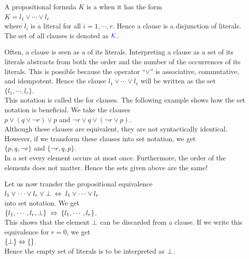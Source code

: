 \begin{Definition}[Clause]
  A propositional formula $K$ is a  when it has the form \\[0.2cm]
  \hspace*{1.3cm} $K = l_1 \vee \cdots \vee l_r$ \\[0.2cm]
  where $l_i$ is a literal for all $i=1,\cdots,r$.  Hence a clause is a disjunction of literals.
  The set of all clauses is denoted as  ${\color{blue}\mathcal{K}}$.
  \eox
\end{Definition}

Often, a clause is seen as a  of its literals.  Interpreting a clause as a set of its literals
abstracts from both the order and the number of the occurrences of its literals.
This is possible because the operator ``$\vee$'' is associative, commutative, and idempotent.  
Hence the clause  $l_1 \vee \cdots \vee l_r$ will be written as the set
\\[0.2cm]
\hspace*{1.3cm} $\{ l_1, \cdots, l_r \}$.
\\[0.2cm]
This notation is called the  for clauses.  
The following example shows how the set notation is beneficial.  We take the clauses
\\[0.2cm]
\hspace*{1.3cm}
$p \vee (q \vee \neg r) \vee p$ \quad and \quad $\neg r \vee q \vee (\neg r \vee p)$. 
\\[0.2cm]
Although these clauses are equivalent, they are not syntactically identical.  However, if we transform these
clauses into set notation, we get
\\[0.2cm]
\hspace*{1.3cm}
$\{p, q, \neg r \}$ \quad and \quad $\{ \neg r, q, p \}$. 
\\[0.2cm]
In a set every element occurs at most once.  Furthermore, the order of the elements does not matter.
Hence the sets given above are the same!

Let us now transfer the propositional equivalence
\\[0.2cm]
\hspace*{1.3cm}
$l_1 \vee \cdots \vee l_r \vee \bot \;\Leftrightarrow\; l_1 \vee \cdots \vee l_r$
\\[0.2cm]
into set notation.  We get
\\[0.2cm]
\hspace*{1.3cm}
$\{ l_1, \cdots, l_r, \bot \} \;\Leftrightarrow\; \{ l_1, \cdots, l_r \}$.
\\[0.2cm]
This shows that the element $\bot$ can be discarded from a clause.  If we write this equivalence for $r=0$,
we get
\\[0.2cm]
\hspace*{1.3cm}
$\{\bot \} \Leftrightarrow \{\}$.
\\[0.2cm]
Hence the empty set of literals is to be interpreted as $\bot$.

